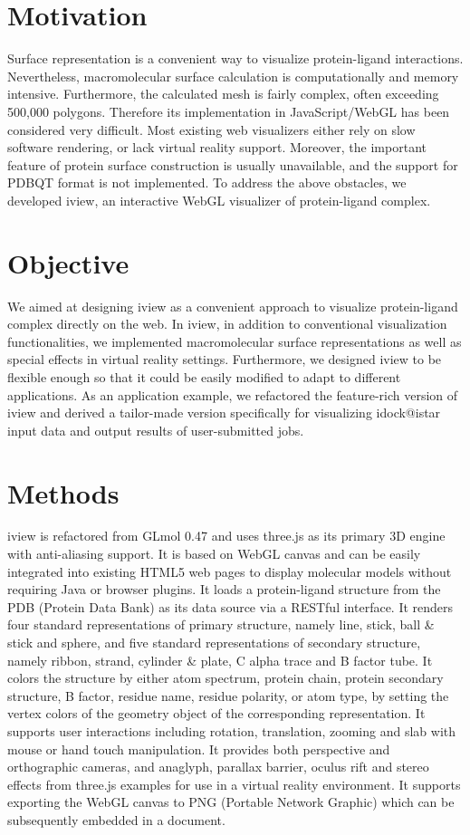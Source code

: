 \section{Motivation}

Surface representation is a convenient way to visualize protein-ligand interactions. Nevertheless, macromolecular surface calculation is computationally and memory intensive. Furthermore, the calculated mesh is fairly complex, often exceeding 500,000 polygons. Therefore its implementation in JavaScript/WebGL has been considered very difficult. Most existing web visualizers either rely on slow software rendering, or lack virtual reality support. Moreover, the important feature of protein surface construction is usually unavailable, and the support for PDBQT format is not implemented. To address the above obstacles, we developed iview, an interactive WebGL visualizer of protein-ligand complex.

\section{Objective}

We aimed at designing iview as a convenient approach to visualize protein-ligand complex directly on the web. In iview, in addition to conventional visualization functionalities, we implemented macromolecular surface representations as well as special effects in virtual reality settings. Furthermore, we designed iview to be flexible enough so that it could be easily modified to adapt to different applications. As an application example, we refactored the feature-rich version of iview and derived a tailor-made version specifically for visualizing idock@istar input data and output results of user-submitted jobs.

\section{Methods}

iview is refactored from GLmol 0.47 and uses three.js as its primary 3D engine with anti-aliasing support. It is based on WebGL canvas and can be easily integrated into existing HTML5 web pages to display molecular models without requiring Java or browser plugins. It loads a protein-ligand structure from the PDB (Protein Data Bank) \citep{1357} as its data source via a RESTful interface. It renders four standard representations of primary structure, namely line, stick, ball \& stick and sphere, and five standard representations of secondary structure, namely ribbon, strand, cylinder \& plate, C alpha trace and B factor tube. It colors the structure by either atom spectrum, protein chain, protein secondary structure, B factor, residue name, residue polarity, or atom type, by setting the vertex colors of the geometry object of the corresponding representation. It supports user interactions including rotation, translation, zooming and slab with mouse or hand touch manipulation. It provides both perspective and orthographic cameras, and anaglyph, parallax barrier, oculus rift and stereo effects from three.js examples for use in a virtual reality environment. It supports exporting the WebGL canvas to PNG (Portable Network Graphic) which can be subsequently embedded in a document.

